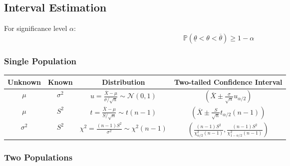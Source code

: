 \documentclass{article}
\begin{document}
\subsection{Interval Estimation}

For significance level $\alpha$:
\[
    \mathbb{P}(\underline{\theta} < \theta < \overline{\theta}) \geq 1 - \alpha
\]

\subsubsection{Single Population}

\begin{center}
\begin{tabular}{|c|c|c|c|}
\hline
\textbf{Unknown} & \textbf{Known} & \textbf{Distribution} & \textbf{Two-tailed Confidence Interval} \\
\hline
$\mu$ & $\sigma^2$ & $u = \frac{\overline{X} - \mu}{\sigma/\sqrt{n}} \sim \mathcal{N}(0,1)$ & $\left(\overline{X} \pm \frac{\sigma}{\sqrt{n}} u_{\alpha/2}\right)$ \\
\hline
$\mu$ & $S^2$ & $t = \frac{\overline{X} - \mu}{S/\sqrt{n}} \sim t(n-1)$ & $\left(\overline{X} \pm \frac{S}{\sqrt{n}} t_{\alpha/2}(n-1)\right)$ \\
\hline
$\sigma^2$ & $S^2$ & $\chi^2 = \frac{(n-1)S^2}{\sigma^2} \sim \chi^2(n-1)$ & $\left(\frac{(n-1)S^2}{\chi^2_{\alpha/2}(n-1)}, \frac{(n-1)S^2}{\chi^2_{1-\alpha/2}(n-1)}\right)$ \\
\hline
\end{tabular}
\end{center}

\subsubsection{Two Populations}
\end{document}
